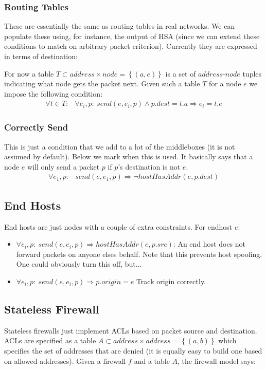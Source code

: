 \subsubsection{Routing Tables}
These are essentially the same as routing tables in real networks. We can populate these using, for instance, the output
of HSA (since we can extend these conditions to match on arbitrary packet criterion). Currently they are expressed in
terms of destination:

For now a table $T \subset address\times node = \left\{ (a, e) \right\}$ is a set of $address$-$node$ tuples indicating what node gets the packet
next. Given such a table $T$ for a node $e$ we impose the following condition:
\begin{align*}
\forall t\in T:& \forall e_i, p:\ send(e, e_i, p) \land p.dest = t.a \Rightarrow e_i = t.e
\end{align*}

\subsubsection{Correctly Send}
This is just a condition that we add to a lot of the middleboxes (it is not assumed by default). Below we mark when this
is used. It basically says that a node $e$ will only send a packet $p$ if $p$'s destination is not $e$.
\begin{align}\label{eq:sanesend}
\forall e_1, p:& send(e, e_1, p) \Rightarrow \neg hostHasAddr(e, p.dest)
\end{align}

\subsection{End Hosts}
End hosts are just nodes with a couple of extra constraints. For endhost $e$:
\begin{itemize}
\item $\forall e_i, p:\ send(e, e_i, p) \Rightarrow hostHasAddr(e, p.src)$: An end host does not forward packets on anyone
elses behalf. Note that this prevents host spoofing. One could obviously turn this off, but...
\item $\forall e_i, p:\ send(e, e_i, p) \Rightarrow p.origin = e$ Track origin correctly.
\end{itemize}

\subsection{Stateless Firewall}
Stateless firewalls just implement ACLs based on packet source and destination. ACLs are specified as a table $A \subset
address\times address = \left\{(a, b)\right\}$ which specifies the set of addresses that are denied (it is equally easy
to build one based on allowed addresses). Given a firewall $f$ and a table $A$, the firewall model says:

